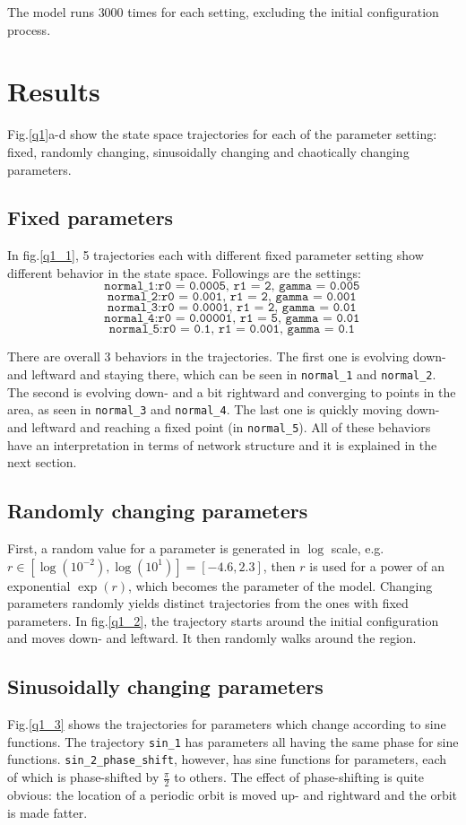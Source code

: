 \documentclass{article}
\begin{document}
 The model runs $3000$ times for each setting, excluding the initial configuration process.
 
\section{Results}
Fig.\ref{q1}a-d show the state space trajectories for each of the parameter setting: fixed, randomly changing, sinusoidally changing and chaotically changing parameters. 

\subsection{Fixed parameters}
In fig.\ref{q1_1}, 5 trajectories each with different fixed parameter setting show different behavior in the state space. Followings are the settings:
\[
	\texttt{normal\_1}: \texttt{r0 = 0.0005, r1 = 2, gamma = 0.005}
\]
\[
	\texttt{normal\_2}: \texttt{r0 = 0.001, r1 = 2, gamma = 0.001}
\]
\[
	\texttt{normal\_3}: \texttt{r0 = 0.0001, r1 = 2, gamma = 0.01}
\]
\[
	\texttt{normal\_4}: \texttt{r0 = 0.00001, r1 = 5, gamma = 0.01}
\]
\[
	\texttt{normal\_5}: \texttt{r0 = 0.1, r1 = 0.001, gamma = 0.1}
\]

There are overall 3 behaviors in the trajectories. The first one is evolving down- and leftward and staying there, which can be seen in \texttt{normal\_1} and \texttt{normal\_2}. The second is evolving down- and a bit rightward and converging to points in the area, as seen in \texttt{normal\_3} and \texttt{normal\_4}. The last one is quickly moving down- and leftward and reaching a fixed point (in \texttt{normal\_5}). All of these behaviors have an interpretation in terms of network structure and it is explained in the next section.

\subsection{Randomly changing parameters}
First, a random value for a parameter is generated in $\log$ scale, e.g. $r \in \left[ \log(10^{-2}), \log(10^1)\right] = \left[-4.6, 2.3\right]$, then $r$ is used for a power of an exponential $\exp(r)$, which becomes the parameter of the model. Changing parameters randomly yields distinct trajectories from the ones with fixed parameters. In fig.\ref{q1_2}, the trajectory starts around the initial configuration and moves down- and leftward. It then randomly walks around the region. 

\subsection{Sinusoidally changing parameters}
Fig.\ref{q1_3} shows the trajectories for parameters which change according to sine functions. The trajectory \texttt{sin\_1} has parameters all having  the same phase for sine functions. \texttt{sin\_2\_phase\_shift}, however, has sine functions for parameters, each of which is phase-shifted by $\frac{\pi}{2}$ to others. The effect of phase-shifting is quite obvious: the location of a periodic orbit is moved up- and rightward and the orbit is made fatter.
\end{document}
